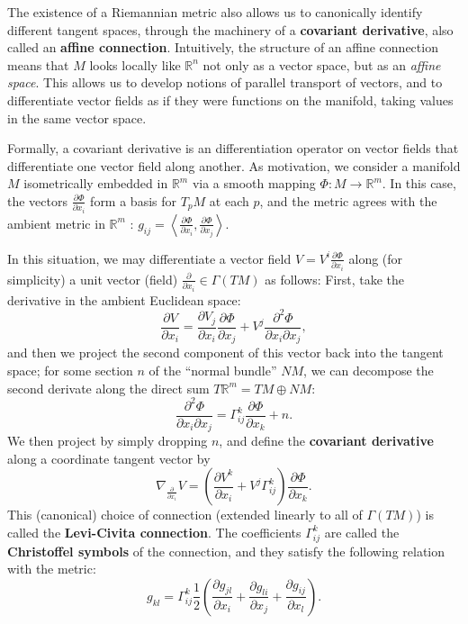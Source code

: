 \documentclass[reqno]{amsart}
\numberwithin{equation}{section}
\begin{document}
The existence of a Riemannian metric also allows us to canonically identify different tangent spaces, through
the machinery of a \textbf{covariant derivative}, also called an
\textbf{affine connection}. Intuitively, the structure of an affine connection means that
$M$ looks locally like $\mathbb R^n$ not only as a vector space, but as an \emph{affine space}. This allows
us to develop notions of parallel transport of vectors, and to differentiate vector fields as if they were functions
on the manifold, taking values in the same vector space.

Formally, a covariant derivative is an differentiation operator on vector fields that differentiate one
vector field along another. 
As motivation, we consider a manifold $M$
isometrically embedded in $\mathbb R^m$ via a smooth mapping $\Phi : M \to \mathbb R^m$.
In this case, the vectors $\frac{\partial \Phi}{\partial x_i}$ form a basis for $T_pM$ at each $p$, and
the metric agrees with the ambient metric in $\mathbb R^m$ :
$g_{ij} = \left\langle \frac{\partial \Phi}{\partial x_i}, \frac{\partial \Phi}{\partial x_j} \right\rangle$.

In this situation, we may differentiate a vector field $V = V^i \frac{\partial \Phi}{\partial x_i}$ along
(for simplicity) a unit vector (field) $\frac{\partial}{\partial x_i} \in \Gamma(TM)$ as follows: First, take
the derivative in the ambient Euclidean space:
$$
    \frac{\partial V}{\partial x_i}
        = \frac{\partial V_j}{\partial x_i}\frac{\partial \Phi}{\partial x_j} +
            V^j \frac{\partial^2 \Phi}{\partial x_i \partial x_j},
$$
and then we project the second component of this vector back into the tangent space; for some section $n$
of the ``normal bundle'' $NM$, we can decompose the second derivate along the direct sum
$T\mathbb R^m = TM \oplus NM$:
$$
    \frac{\partial^2 \Phi}{\partial x_i \partial x_j}
        = \Gamma^k_{ij} \frac{\partial \Phi}{\partial x_k} + n.
$$
We then project by simply dropping $n$, and define the \textbf{covariant derivative} along a coordinate tangent
vector by
$$
    \nabla_{\frac{\partial}{\partial x_i}} V = \left( \frac{\partial V^k}{\partial x_i} + V^j \Gamma^k_{ij}
        \right) \frac{\partial \Phi}{\partial x_k}.
$$
This (canonical) choice of connection (extended linearly to all of $\Gamma(TM)$)
is called the \textbf{Levi-Civita connection}.
The coefficients $\Gamma^k_{ij}$ are called the \textbf{Christoffel symbols} of the connection, and they satisfy
the following relation with the metric:
\begin{equation}
    g_{kl}  = \Gamma^k_{ij} \frac 12 \left(\frac{\partial g_{jl}}{\partial x_i}
        + \frac{\partial g_{li}}{\partial x_j} + \frac{\partial g_{ij}}{\partial x_l} \right).
\label{christoffel}
\end{equation}
\end{document}
